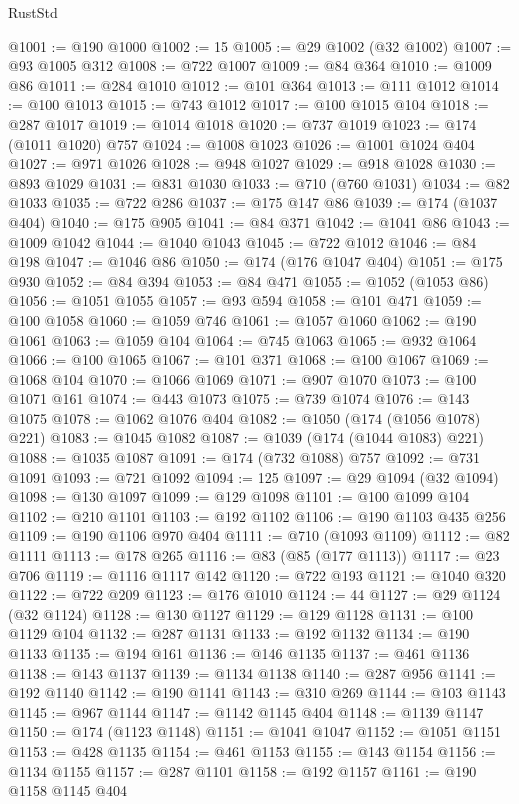\begin{lexlean}{RustStd}
\begin{coremodule}
{\begin{coremodule}
{{{{{{{{{{{{{{{{{{{{{{{{{{{{{{{{{{{{{{{{{{{{{{{{{{{{{{{@1001 := @190 @1000
@1002 := 15
@1005 := @29 @1002 (@32 @1002)
@1007 := @93 @1005 @312
@1008 := @722 @1007
@1009 := @84 @364
@1010 := @1009 @86
@1011 := @284 @1010
@1012 := @101 @364
@1013 := @111 @1012
@1014 := @100 @1013
@1015 := @743 @1012
@1017 := @100 @1015 @104
@1018 := @287 @1017
@1019 := @1014 @1018
@1020 := @737 @1019
@1023 := @174 (@1011 @1020) @757
@1024 := @1008 @1023
@1026 := @1001 @1024 @404
@1027 := @971 @1026
@1028 := @948 @1027
@1029 := @918 @1028
@1030 := @893 @1029
@1031 := @831 @1030
@1033 := @710 (@760 @1031)
@1034 := @82 @1033
@1035 := @722 @286
@1037 := @175 @147 @86
@1039 := @174 (@1037 @404)
@1040 := @175 @905
@1041 := @84 @371
@1042 := @1041 @86
@1043 := @1009 @1042
@1044 := @1040 @1043
@1045 := @722 @1012
@1046 := @84 @198
@1047 := @1046 @86
@1050 := @174 (@176 @1047 @404)
@1051 := @175 @930
@1052 := @84 @394
@1053 := @84 @471
@1055 := @1052 (@1053 @86)
@1056 := @1051 @1055
@1057 := @93 @594
@1058 := @101 @471
@1059 := @100 @1058
@1060 := @1059 @746
@1061 := @1057 @1060
@1062 := @190 @1061
@1063 := @1059 @104
@1064 := @745 @1063
@1065 := @932 @1064
@1066 := @100 @1065
@1067 := @101 @371
@1068 := @100 @1067
@1069 := @1068 @104
@1070 := @1066 @1069
@1071 := @907 @1070
@1073 := @100 @1071 @161
@1074 := @443 @1073
@1075 := @739 @1074
@1076 := @143 @1075
@1078 := @1062 @1076 @404
@1082 := @1050 (@174 (@1056 @1078) @221)
@1083 := @1045 @1082
@1087 := @1039 (@174 (@1044 @1083) @221)
@1088 := @1035 @1087
@1091 := @174 (@732 @1088) @757
@1092 := @731 @1091
@1093 := @721 @1092
@1094 := 125
@1097 := @29 @1094 (@32 @1094)
@1098 := @130 @1097
@1099 := @129 @1098
@1101 := @100 @1099 @104
@1102 := @210 @1101
@1103 := @192 @1102
@1106 := @190 @1103 @435 @256
@1109 := @190 @1106 @970 @404
@1111 := @710 (@1093 @1109)
@1112 := @82 @1111
@1113 := @178 @265
@1116 := @83 (@85 (@177 @1113))
@1117 := @23 @706
@1119 := @1116 @1117 @142
@1120 := @722 @193
@1121 := @1040 @320
@1122 := @722 @209
@1123 := @176 @1010
@1124 := 44
@1127 := @29 @1124 (@32 @1124)
@1128 := @130 @1127
@1129 := @129 @1128
@1131 := @100 @1129 @104
@1132 := @287 @1131
@1133 := @192 @1132
@1134 := @190 @1133
@1135 := @194 @161
@1136 := @146 @1135
@1137 := @461 @1136
@1138 := @143 @1137
@1139 := @1134 @1138
@1140 := @287 @956
@1141 := @192 @1140
@1142 := @190 @1141
@1143 := @310 @269
@1144 := @103 @1143
@1145 := @967 @1144
@1147 := @1142 @1145 @404
@1148 := @1139 @1147
@1150 := @174 (@1123 @1148)
@1151 := @1041 @1047
@1152 := @1051 @1151
@1153 := @428 @1135
@1154 := @461 @1153
@1155 := @143 @1154
@1156 := @1134 @1155
@1157 := @287 @1101
@1158 := @192 @1157
@1161 := @190 @1158 @1145 @404
}}}}}}}}}}}}}}}}}}}}}}}}}}}}}}}}}}}}}}}}}}}}}}}}}}}}}}}
\end{coremodule}}
\end{coremodule}
\end{lexlean}
